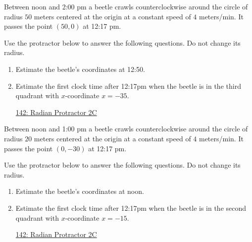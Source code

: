 \documentclass{ximera}
\begin{document}
\begin{question}  \label{Q9dfedferyghnfetf4}

Between noon and 2:00 pm a beetle crawls counterclockwise around the circle of radius $50$ meters centered at the origin at a constant speed of $4$ meters/min. It passes the point $(50,0)$ at 12:17 pm.

Use the protractor below to answer the following questions. Do not change its radius.
\begin{enumerate}

\item Estimate the beetle's coordinates at 12:50. 

\item Estimate the first clock time after 12:17pm when the beetle is in the third quadrant with $x$-coordinate $x=-35$.

\begin{onlineOnly}
    \begin{center}
\end{center}
\end{onlineOnly}

\href{https://www.desmos.com/calculator/lbkveixdno}{142: Radian Protractor 2C}

\end{enumerate}
\end{question}

\begin{question}  \label{Q9dfe9dfetf4}

Between noon and 1:00 pm a beetle crawls counterclockwise around the circle of radius $20$ meters centered at the origin at a constant speed of $4$ meters/min. It passes the point $(0,-30)$ at 12:17 pm.

Use the protractor below to answer the following questions. Do not change its radius.
\begin{enumerate}

\item Estimate the beetle's coordinates at noon. 

\item Estimate the first clock time after 12:17pm when the beetle is in the second quadrant with $x$-coordinate $x=-15$.

\begin{onlineOnly}
    \begin{center}
\end{center}
\end{onlineOnly}

\href{https://www.desmos.com/calculator/lbkveixdno}{142: Radian Protractor 2C}


\end{enumerate}

\end{question}
\end{document}
